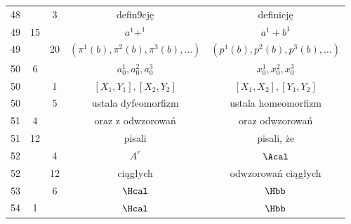 \documentclass[a4paper,11pt]{article}
\numberwithin{equation}{section}
\begin{document}
\begin{center}
\begin{tabular}{|c|c|c|c|c|}
    48  & & \hphantom{0}3 & defin9cję & definicję \\
    49  & 15 & & $a^{ 1 } + ^{ 1 }$ & $a^{ 1 } + b^{ 1 }$ \\
    49  & & 20 & $( \pi^{ 1 } ( b ), \pi^{ 2 } ( b ), \pi^{ 3 } ( b ), \ldots )$
           & $( p^{ 1 } ( b ), p^{ 2 } ( b ), p^{ 3 } ( b ), \ldots )$ \\
    50  & \hphantom{0}6 & & $a_{ 0 }^{ 1 }, a_{ 0 }^{ 2 }, a_{ 0 }^{ 3 }$
    & $x_{ 0 }^{ 1 }, x_{ 0 }^{ 2 }, x_{ 0 }^{ 3 }$ \\
    50  & & \hphantom{0}1 & $[ X_{ 1 }, Y_{ 1 }], [ X_{ 2 }, Y_{ 2 } ]$
    & $[ X_{ 1 }, X_{ 2 }], [ Y_{ 1 }, Y_{ 2 } ]$ \\
    50  & & \hphantom{0}5 & ustala dyfeomorfizm & ustala homeomorfizm \\
    51  & \hphantom{0}4 & & oraz z odwzorowań & oraz odwzorowań \\
    51  & 12 & & pisali & pisali, że \\
    52  & & \hphantom{0}4 & $A^{ r }$ & $\Acal$ \\
    52  & & 12 & ciągłych & odwzorowań ciągłych \\
    53  & & \hphantom{0}6 & $\Hcal$ & $\Hbb$ \\
    54  & \hphantom{0}1 & & $\Hcal$ & $\Hbb$ \\
    \hline
  \end{tabular}





  \newpage


\end{center}
\end{document}
